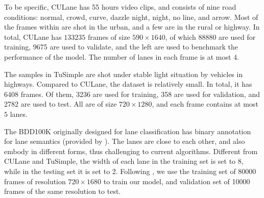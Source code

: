 \documentclass[preprint,12pt,review]{elsarticle}
\begin{document}
To be specific, CULane has 55 hours video clips, and consists of nine road conditions:  normal, crowd, curve, dazzle night, night, no line, and arrow. Most of the frames within are shot in the urban, and a few are in the rural or highway. In total, CULane has $133235$ frames of size $590\times 1640$, of which 88880 are used for training, 9675 are used to validate, and the left are used to benchmark the performance of the model. The number of lanes in each frame is at most $4$.

The samples in TuSimple are shot under stable light situation by vehicles in highways. Compared to CULane, the dataset is relatively small. In total, it has $6408$ frames. Of them, 3236 are used for training, 358 are used for validation, and 2782 are used to test. All are of size $720\times 1280$, and each frame contains at most $5$ lanes. 

The BDD100K originally designed for lane classification has binary annotation for lane semantics (provided by \cite{distillation}). The lanes are close to each other, and also embody in different forms, thus challenging to current algorithms. Different from CULane and TuSimple, the width of each lane in the training set is set to 8, while in the testing set it is set to 2. Following \cite{distillation}, we use the training set of 80000 frames of resolution $720\times 1680$ to train our model, and validation set of 10000 frames of the same resolution to test.
\end{document}
